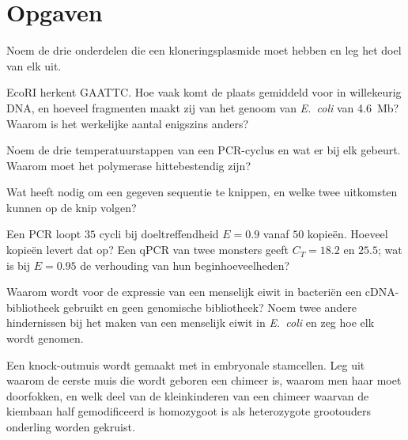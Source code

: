 \section{Opgaven}

\begin{exercise}[$\star$]\label{exo:b3:genetic-engineering:1}
Noem de drie onderdelen die een kloneringsplasmide moet hebben en leg
het doel van elk uit.
\end{exercise}

\begin{exercise}[$\star$]\label{exo:b3:genetic-engineering:2}
EcoRI herkent GAATTC. Hoe vaak komt de plaats gemiddeld voor in
willekeurig DNA, en hoeveel fragmenten maakt zij van het genoom van
\emph{E.~coli} van \qty{4.6}{Mb}? Waarom is het werkelijke aantal
enigszins anders?
\end{exercise}

\begin{exercise}[$\star$]\label{exo:b3:genetic-engineering:3}
Noem de drie temperatuurstappen van een PCR-cyclus en wat er bij elk
gebeurt. Waarom moet het polymerase hittebestendig zijn?
\end{exercise}

\begin{exercise}[$\star$]\label{exo:b3:genetic-engineering:4}
Wat heeft  nodig om een gegeven sequentie te knippen, en welke twee
uitkomsten kunnen op de knip volgen?
\end{exercise}

\begin{exercise}[$\star\star$]\label{exo:b3:genetic-engineering:5}
Een PCR loopt $35$ cycli bij doeltreffendheid $E = 0.9$ vanaf $50$
kopieën. Hoeveel kopieën levert dat op? Een qPCR van twee monsters
geeft $C_{T} = 18.2$ en $25.5$; wat is bij $E = 0.95$ de verhouding van
hun beginhoeveelheden?
\end{exercise}

\begin{exercise}[$\star\star$]\label{exo:b3:genetic-engineering:6}
Waarom wordt voor de expressie van een menselijk eiwit in bacteriën een
cDNA-bibliotheek gebruikt en geen genomische bibliotheek? Noem twee
andere hindernissen bij het maken van een menselijk eiwit in
\emph{E.~coli} en zeg hoe elk wordt genomen.
\end{exercise}

\begin{exercise}[$\star\star$]\label{exo:b3:genetic-engineering:7}
Een knock-outmuis wordt gemaakt met  in
embryonale stamcellen. Leg uit waarom de eerste muis die wordt geboren
een chimeer is, waarom men haar moet doorfokken, en welk deel van de
kleinkinderen van een chimeer waarvan de kiembaan half gemodificeerd is
homozygoot  is als heterozygote grootouders onderling worden
gekruist.
\end{exercise}

